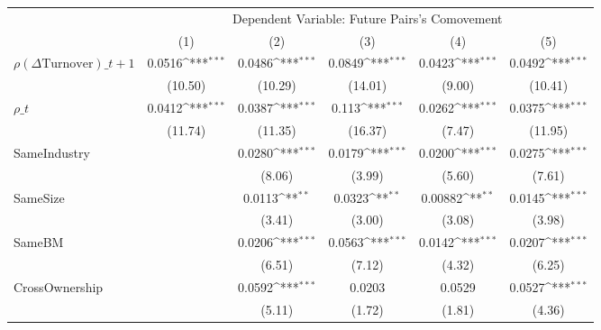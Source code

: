{
\def\sym#1{\ifmmode^{#1}\else\(^{#1}\)\fi}
\begin{tabular}{l*{5}{c}}
\hline\hline
                    &\multicolumn{5}{c}{Dependent Variable:  Future Pairs's Comovement}                                           \\\cmidrule(lr){2-6}
                    &\multicolumn{1}{c}{(1)}         &\multicolumn{1}{c}{(2)}         &\multicolumn{1}{c}{(3)}         &\multicolumn{1}{c}{(4)}         &\multicolumn{1}{c}{(5)}         \\
\hline
 $ {\rho(\Delta \text{Turnover})\_{t+1}} $ &      0.0516\sym{***}&      0.0486\sym{***}&      0.0849\sym{***}&      0.0423\sym{***}&      0.0492\sym{***}\\
                    &     (10.50)         &     (10.29)         &     (14.01)         &      (9.00)         &     (10.41)         \\
[1em]
 $ {\rho\_t} $       &      0.0412\sym{***}&      0.0387\sym{***}&       0.113\sym{***}&      0.0262\sym{***}&      0.0375\sym{***}\\
                    &     (11.74)         &     (11.35)         &     (16.37)         &      (7.47)         &     (11.95)         \\
[1em]
SameIndustry        &                     &      0.0280\sym{***}&      0.0179\sym{***}&      0.0200\sym{***}&      0.0275\sym{***}\\
                    &                     &      (8.06)         &      (3.99)         &      (5.60)         &      (7.61)         \\
[1em]
SameSize            &                     &      0.0113\sym{**} &      0.0323\sym{**} &     0.00882\sym{**} &      0.0145\sym{***}\\
                    &                     &      (3.41)         &      (3.00)         &      (3.08)         &      (3.98)         \\
[1em]
SameBM              &                     &      0.0206\sym{***}&      0.0563\sym{***}&      0.0142\sym{***}&      0.0207\sym{***}\\
                    &                     &      (6.51)         &      (7.12)         &      (4.32)         &      (6.25)         \\
[1em]
CrossOwnership      &                     &      0.0592\sym{***}&      0.0203         &      0.0529         &      0.0527\sym{***}\\
                    &                     &      (5.11)         &      (1.72)         &      (1.81)         &      (4.36)         \\

\end{tabular}}
